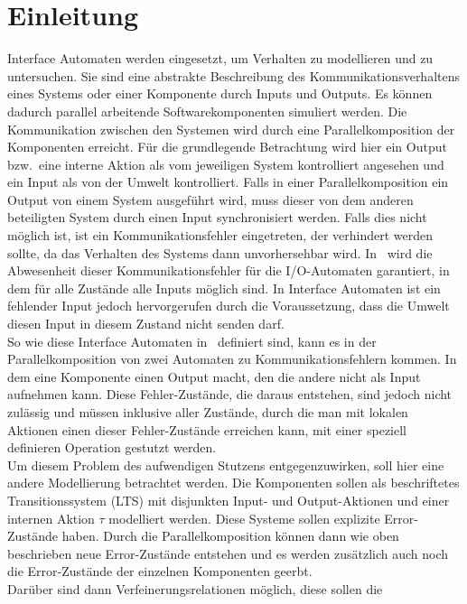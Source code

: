 \chapter{Einleitung}

Interface Automaten werden eingesetzt, um Verhalten zu modellieren und zu
untersuchen. Sie sind eine abstrakte Beschreibung des Kommunikationsverhaltens
eines Systems oder einer Komponente durch Inputs und Outputs. Es können dadurch
parallel arbeitende Softwarekomponenten simuliert werden. Die Kommunikation
zwischen den Systemen wird durch eine Parallelkomposition der Komponenten
erreicht. Für die grundlegende Betrachtung wird hier ein Output bzw.\ eine
interne Aktion als vom jeweiligen System
kontrolliert angesehen und ein Input als von der Umwelt kontrolliert. Falls in
einer Parallelkomposition ein Output von einem System ausgeführt wird, muss
dieser von dem anderen beteiligten System durch einen
Input synchronisiert werden. Falls dies nicht möglich ist, ist ein
Kommunikationsfehler eingetreten, der verhindert werden sollte, da das
Verhalten des Systems dann unvorhersehbar wird. In~\cite{Lynch1996} wird die
Abwesenheit dieser Kommunikationsfehler
für die I/O-Automaten garantiert, in dem für alle Zustände alle Inputs möglich
sind. In Interface Automaten ist ein fehlender Input jedoch hervorgerufen durch
die Voraussetzung, dass die Umwelt diesen Input in diesem Zustand nicht senden
darf.\\
So wie diese Interface Automaten in~\cite{Alfaro2004} definiert sind, kann es
in der Parallelkomposition von zwei Automaten zu Kommunikationsfehlern kommen.
In dem eine Komponente einen Output macht, den die andere nicht als Input
aufnehmen kann. Diese Fehler-Zustände, die daraus entstehen, sind jedoch nicht
zulässig und müssen inklusive aller Zustände, durch die man mit lokalen
Aktionen einen dieser Fehler-Zustände erreichen kann, mit einer speziell definieren
Operation gestutzt werden.\\
Um diesem Problem des aufwendigen Stutzens entgegenzuwirken, soll hier eine
andere Modellierung betrachtet werden. Die Komponenten sollen als beschriftetes
Transitionssystem (LTS) mit disjunkten Input- und Output-Aktionen und einer
internen Aktion $\tau$ modelliert werden. Diese Systeme sollen explizite
Error-Zustände haben. Durch die Parallelkomposition können dann wie oben
beschrieben neue Error-Zustände entstehen und es werden zusätzlich auch noch die
Error-Zustände der einzelnen Komponenten geerbt.\\
Darüber sind dann Verfeinerungsrelationen möglich, diese sollen die
